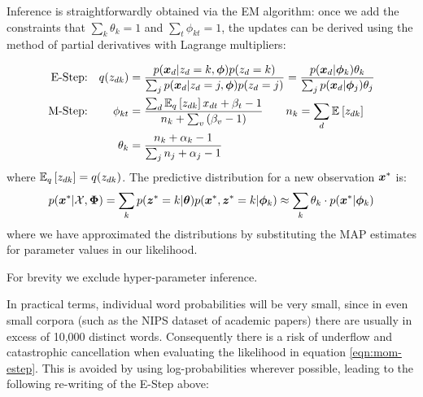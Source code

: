 Inference is straightforwardly obtained via the EM algorithm: once we add the constraints that $\sum_k \theta_k = 1$ and $\sum_t \phi_{kt} = 1$, the updates can be derived using the method of partial derivatives with Lagrange multipliers:


\begin{align}
\text{E-Step:} & & q(z_{dk}) 
& = \frac{p(\xd|z_d = k, \param)p(z_d = k)}{\sum_j p(\xd|z_d = j, \param)p(z_d = j)} 
= \frac{p(\xd | \param_k) \theta_k}{\sum_j p(\xd | \param_j) \theta_j} \label{eqn:mom-estep} \\
\text{M-Step:} 
& & \phi_{kt} & =
    \frac{
        \sum_d \ex{z_{dk}}{q}x_{dt} + \beta_t - 1
    }{
        n_k + \sum_v \left( \beta_v - 1 \right)
    } \qquad n_k = \sum_d \ex{z_{dk}}{} \\
& & \theta_k & =  
    \frac{
        n_k + \alpha_k - 1
    }{
        \sum_j n_j + \alpha_j - 1
    } \label{eqn:mom-mstep}
\end{align}
where $\ex{z_{dk}}{q} = q(z_{dk})$. The predictive distribution for a new observation $\xnew$ is:
\begin{align}
p(\xnew | \xdat, \params)  = \sum_k p(\znew = k | \vv{\theta}) p(\xnew, \znew = k | \param_k) 
\approx \sum_k \theta_k \cdot p(\xnew | \param_k)
\end{align}
where we have approximated the distributions by substituting the MAP estimates for parameter values in our likelihood.

For brevity we exclude hyper-parameter inference.

In practical terms, individual word probabilities will be very small, since in even small corpora (such as the NIPS dataset of academic papers) there are usually in excess of 10,000 distinct words. Consequently there is a risk of underflow and catastrophic cancellation when evaluating the likelihood in equation \eqref{eqn:mom-estep}. This is avoided by using log-probabilities wherever possible, leading to the following re-writing of the E-Step above:

